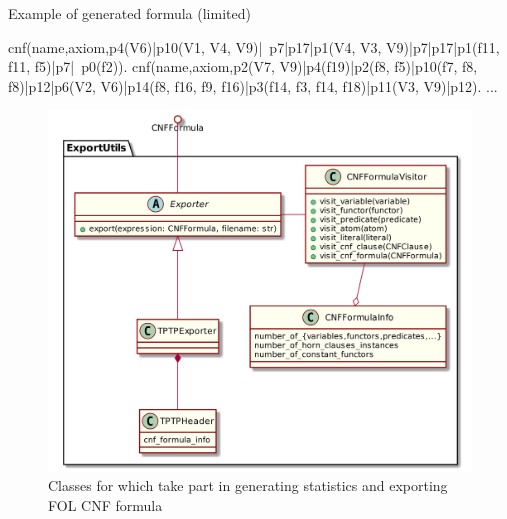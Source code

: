 \begin{listing}[h]
  \caption{Example of generated formula (limited)}
\begin{tptpcode}
% 
cnf(name,axiom,p4(V6)|p10(V1, V4, V9)|~p7|p17|p1(V4, V3, V9)|p7|p17|p1(f11, f11, f5)|p7|~p0(f2)).
cnf(name,axiom,p2(V7, V9)|p4(f19)|p2(f8, f5)|p10(f7, f8, f8)|p12|p6(V2, V6)|p14(f8, f16, f9, f16)|p3(f14, f3, f14, f18)|p11(V3, V9)|p12).
...
\end{tptpcode}
  \label{lis:TPTPExample}
\end{listing}

\begin{figure}[h]
\begin{centering}
  \includegraphics[width=\textwidth]{logic-formula-generator/fol/cnf_formula_statistics.png}
  \caption{Classes for which take part in generating statistics and exporting FOL CNF formula}
  \label{pic:FormulaExportUtils}
\end{centering}
\end{figure}
